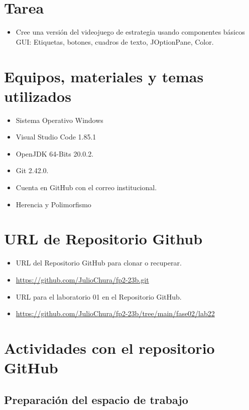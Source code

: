 \documentclass{article}
\begin{document}
	\section{Tarea}
	\begin{itemize}		
		\item Cree una versión del videojuego de estrategia usando componentes básicos GUI: Etiquetas, botones,
		cuadros de texto, JOptionPane, Color.
	\end{itemize}
	
	\section{Equipos, materiales y temas utilizados}
	\begin{itemize}
		\item Sistema Operativo Windows
		\item Visual Studio Code 1.85.1
		\item OpenJDK 64-Bits 20.0.2.
		\item Git 2.42.0.
		\item Cuenta en GitHub con el correo institucional.
		\item Herencia y Polimorfismo
	\end{itemize}
	
	\section{URL de Repositorio Github}
	\begin{itemize}
		\item URL del Repositorio GitHub para clonar o recuperar.
		\item \url{https://github.com/JulioChura/fp2-23b.git}
		\item URL para el laboratorio 01 en el Repositorio GitHub.
		\item \url{https://github.com/JulioChura/fp2-23b/tree/main/fase02/lab22}
	\end{itemize}
	
	\section{Actividades con el repositorio GitHub}
	
	
	
	
	
	
	
	\subsection{Preparación del espacio de trabajo}
	
\end{document}
